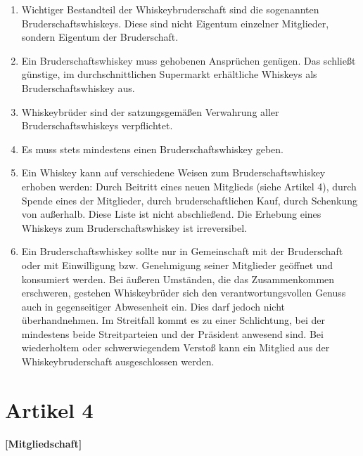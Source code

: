 \documentclass[a4paper,12pt]{article}
\begin{document}
\begin{enumerate}

\item Wichtiger Bestandteil der Whiskeybruderschaft sind die sogenannten Bruderschaftswhiskeys.
  Diese sind nicht Eigentum einzelner Mitglieder, sondern Eigentum der Bruderschaft.

\item Ein Bruderschaftswhiskey muss gehobenen Ansprüchen genügen. Das schließt günstige, im
  durchschnittlichen Supermarkt erhältliche Whiskeys als Bruderschaftswhiskey aus.

\item Whiskeybrüder sind der satzungsgemäßen Verwahrung aller Bruderschaftswhiskeys verpflichtet.

\item Es muss stets mindestens einen Bruderschaftswhiskey geben.

\item Ein Whiskey kann auf verschiedene Weisen zum Bruderschaftswhiskey erhoben werden: Durch
  Beitritt eines neuen Mitglieds (siehe Artikel 4), durch Spende eines der Mitglieder, durch
  bruderschaftlichen Kauf, durch Schenkung von außerhalb. Diese Liste ist nicht abschließend. Die
  Erhebung eines Whiskeys zum Bruderschaftswhiskey ist irreversibel.

\item Ein Bruderschaftswhiskey sollte nur in Gemeinschaft mit der Bruderschaft oder mit Einwilligung
  bzw. Genehmigung seiner Mitglieder geöffnet und konsumiert werden. Bei äußeren Umständen, die das
  Zusammenkommen erschweren, gestehen Whiskeybrüder sich den verantwortungsvollen Genuss auch in
  gegenseitiger Abwesenheit ein. Dies darf jedoch nicht überhandnehmen. Im Streitfall kommt es zu
  einer Schlichtung, bei der mindestens beide Streitparteien und der Präsident anwesend sind. Bei
  wiederholtem oder schwerwiegendem Verstoß kann ein Mitglied aus der Whiskeybruderschaft
  ausgeschlossen werden.

\end{enumerate}



\section*{Artikel 4}
\textbf{[Mitgliedschaft]}
\end{document}
